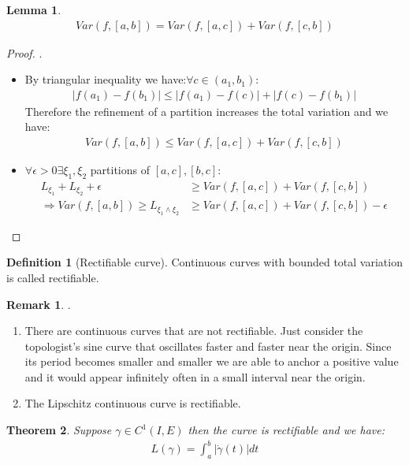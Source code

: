 \documentclass[12pt,fleqn]{book}
\newtheorem{theorem}{Theorem}[section]
\newtheorem{lemma}[theorem]{Lemma}
\theoremstyle{definition}
\newtheorem{definition}{Definition}[section]
\newtheorem*{remark}{Remark}
\begin{document}
\begin{lemma}
	\begin{align*}
		Var(f, [a, b]) = Var(f, [a, c]) + Var(f, [c, b])
	\end{align*}
\end{lemma}
\begin{proof}.
	\begin{itemize}
		\item By triangular inequality we have:$ \forall c \in (a_1, b_1)$:
		\begin{align*}
			|f(a_1) - f(b_1)| \leq |f(a_1) - f(c)| + |f(c) - f(b_1)|
		\end{align*}
		Therefore the refinement of a partition increases the total variation and we have:
		\begin{align*}
			Var(f, [a, b]) \leq Var(f, [a, c]) + Var(f, [c, b])
		\end{align*}
		
		\item $\forall \epsilon > 0 \exists \xi_1, \xi_2$ partitions of $[a, c], [b, c]$: 
		\begin{align*}
			L_{\xi_1} + L_{\xi_2} + \epsilon &\geq Var(f, [a, c]) + Var(f, [c, b])\\
		\Rightarrow	
		Var(f, [a, b]) \geq L_{\xi_1 \wedge \xi_2}  &\geq Var(f, [a, c]) + Var(f, [c, b])-\epsilon
		\end{align*} 
	\end{itemize}
\end{proof}

\begin{definition}[Rectifiable curve]
	Continuous curves with bounded total variation is called rectifiable.
\end{definition}
\begin{remark}.
\begin{enumerate}
	\item There are continuous curves that are not rectifiable. Just consider the topologist's sine curve that oscillates faster and faster near the origin. Since its period becomes smaller and smaller we are able to anchor a positive value and it would appear infinitely often in a small interval near the origin.
	\item The Lipschitz continuous curve is rectifiable.
\end{enumerate}	
\end{remark}

\begin{theorem}
	Suppose $\gamma \in C^1(I, E)$ then the curve is rectifiable and we have:
	\begin{align*}
		L(\gamma) = \int_a^b |\dot{\gamma}(t)|dt
	\end{align*}
\end{theorem}
\end{document}

